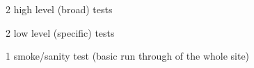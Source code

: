 2 high level (broad) tests

2 low level (specific) tests

1 smoke/sanity test (basic run through of the whole site)